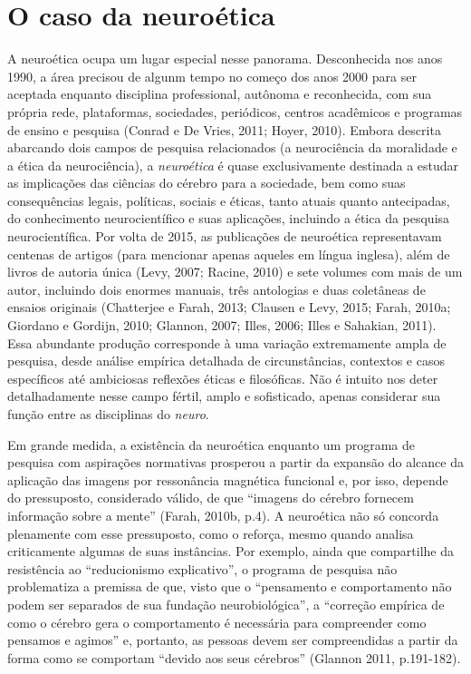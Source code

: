 \chapter{O caso da neuroética}

A neuroética ocupa um lugar especial nesse panorama. Desconhecida nos
anos 1990, a área precisou de algunm tempo no começo dos anos 2000 para
ser aceptada enquanto disciplina professional, autônoma e reconhecida,
com sua própria rede, plataformas, sociedades, periódicos, centros
acadêmicos e programas de ensino e pesquisa (Conrad e De Vries, 2011;
Hoyer, 2010). Embora descrita abarcando dois campos de pesquisa
relacionados (a neurociência da moralidade e a ética da neurociência), a
\emph{neuroética} é quase exclusivamente destinada a estudar as
implicações das ciências do cérebro para a sociedade, bem como suas
consequências legais, políticas, sociais e éticas, tanto atuais quanto
antecipadas, do conhecimento neurocientífico e suas aplicações,
incluindo a ética da pesquisa neurocientífica. Por volta de 2015, as
publicações de neuroética representavam centenas de artigos (para
mencionar apenas aqueles em língua inglesa), além de livros de autoria
única (Levy, 2007; Racine, 2010) e sete volumes com mais de um autor,
incluindo dois enormes manuais, três antologias e duas coletâneas de
ensaios originais (Chatterjee e Farah, 2013; Clausen e Levy, 2015;
Farah, 2010a; Giordano e Gordijn, 2010; Glannon, 2007; Illes, 2006;
Illes e Sahakian, 2011). Essa abundante produção corresponde à uma
variação extremamente ampla de pesquisa, desde análise empírica
detalhada de circunstâncias, contextos e casos específicos até
ambiciosas reflexões éticas e filosóficas. Não é intuito nos deter
detalhadamente nesse campo fértil, amplo e sofisticado, apenas
considerar sua função entre as disciplinas do \emph{neuro}.

Em grande medida, a existência da neuroética enquanto um programa de
pesquisa com aspirações normativas prosperou a partir da expansão do
alcance da aplicação das imagens por ressonância magnética funcional e,
por isso, depende do pressuposto, considerado válido, de que ``imagens
do cérebro fornecem informação sobre a mente'' (Farah, 2010b, p.4). A
neuroética não só concorda plenamente com esse pressuposto, como o
reforça, mesmo quando analisa criticamente algumas de suas instâncias.
Por exemplo, ainda que compartilhe da resistência ao ``reducionismo
explicativo'', o programa de pesquisa não problematiza a premissa de
que, visto que o ``pensamento e comportamento não podem ser separados de
sua fundação neurobiológica'', a ``correção empírica de como o cérebro
gera o comportamento é necessária para compreender como pensamos e
agimos'' e, portanto, as pessoas devem ser compreendidas a partir da
forma como se comportam ``devido aos seus cérebros'' (Glannon 2011,
p.191-182).

